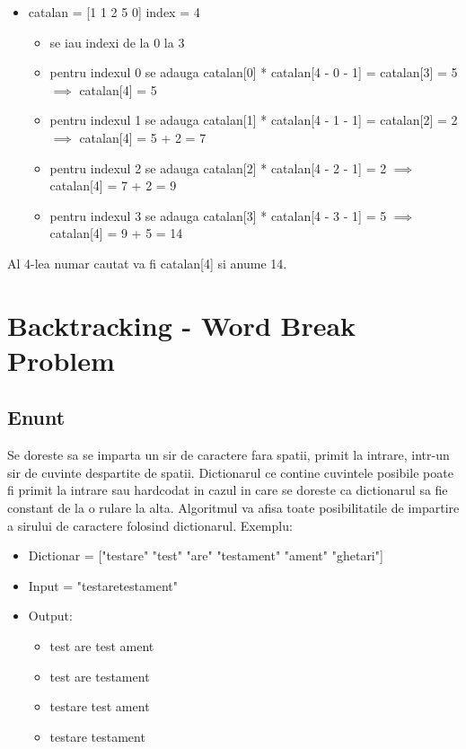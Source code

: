 \documentclass[runningheads]{llncs}
\begin{document}
\begin{itemize}
	\item catalan = [1 1 2 5 0] index = 4
	\begin{itemize}
		\setlength\itemsep{0em}
		\item se iau indexi de la 0 la 3
		\item pentru indexul 0 se adauga catalan[0] * catalan[4 - 0 - 1] = catalan[3] = 5 $\implies$ catalan[4] = 5
		\item pentru indexul 1 se adauga catalan[1] * catalan[4 - 1 - 1] = catalan[2] = 2 $\implies$ catalan[4] = 5 + 2 = 7
		\item pentru indexul 2 se adauga catalan[2] * catalan[4 - 2 - 1] = 2 $\implies$ catalan[4] = 7 + 2 = 9
		\item pentru indexul 3 se adauga catalan[3] * catalan[4 - 3 - 1] = 5 $\implies$ catalan[4] = 9 + 5 = 14
	\end{itemize}
\end{itemize}
Al 4-lea numar cautat va fi catalan[4] si anume 14.
\section{Backtracking - Word Break Problem}
\subsection{Enunt}
Se doreste sa se imparta un sir de caractere fara spatii, primit la intrare, intr-un sir de cuvinte despartite de spatii. Dictionarul ce
contine cuvintele posibile poate fi primit la intrare sau hardcodat in cazul in care se doreste ca dictionarul sa fie constant de la o
rulare la alta. Algoritmul va afisa toate posibilitatile de impartire a sirului de caractere folosind dictionarul. Exemplu:
\begin{itemize}
	\item Dictionar = ["testare" "test" "are" "testament" "ament" "ghetari"]
	\item Input = "testaretestament"
	\item Output:
		\begin{itemize}
			\item test are test ament
			\item test are testament
			\item testare test ament
			\item testare testament
		\end{itemize}
\end{itemize}
\end{document}
